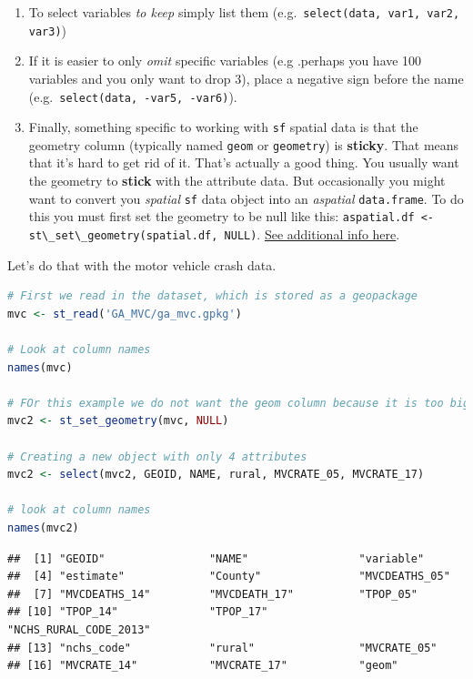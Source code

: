 \documentclass[
]{book}
\newcommand{\passthrough}[1]{#1}
\providecommand{\tightlist}{%
  \setlength{\itemsep}{0pt}\setlength{\parskip}{0pt}}
\begin{document}
\begin{enumerate}
\def\labelenumi{\arabic{enumi}.}
\tightlist
\item
  To select variables \emph{to keep} simply list them (e.g.~\passthrough{\lstinline!select(data, var1, var2, var3)!})
\item
  If it is easier to only \emph{omit} specific variables (e.g .perhaps you have 100 variables and you only want to drop 3), place a negative sign before the name (e.g.~\passthrough{\lstinline!select(data, -var5, -var6)!}).
\item
  Finally, something specific to working with \passthrough{\lstinline!sf!} spatial data is that the geometry column (typically named \passthrough{\lstinline!geom!} or \passthrough{\lstinline!geometry!}) is \textbf{sticky}. That means that it's hard to get rid of it. That's actually a good thing. You usually want the geometry to \textbf{stick} with the attribute data. But occasionally you might want to convert you \emph{spatial} \passthrough{\lstinline!sf!} data object into an \emph{aspatial} \passthrough{\lstinline!data.frame!}. To do this you must first set the geometry to be null like this: \passthrough{\lstinline!aspatial.df <- st\_set\_geometry(spatial.df, NULL)!}. \protect\hyperlink{sf-overview}{See additional info here}.
\end{enumerate}

Let's do that with the motor vehicle crash data.

\begin{lstlisting}[language=R]
# First we read in the dataset, which is stored as a geopackage
mvc <- st_read('GA_MVC/ga_mvc.gpkg')

# Look at column names
names(mvc)

# FOr this example we do not want the geom column because it is too big to view
mvc2 <- st_set_geometry(mvc, NULL)

# Creating a new object with only 4 attributes
mvc2 <- select(mvc2, GEOID, NAME, rural, MVCRATE_05, MVCRATE_17)

# look at column names
names(mvc2)
\end{lstlisting}

\begin{lstlisting}
##  [1] "GEOID"                "NAME"                 "variable"            
##  [4] "estimate"             "County"               "MVCDEATHS_05"        
##  [7] "MVCDEATHS_14"         "MVCDEATH_17"          "TPOP_05"             
## [10] "TPOP_14"              "TPOP_17"              "NCHS_RURAL_CODE_2013"
## [13] "nchs_code"            "rural"                "MVCRATE_05"          
## [16] "MVCRATE_14"           "MVCRATE_17"           "geom"
\end{lstlisting}
\end{document}
